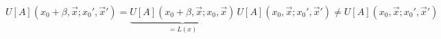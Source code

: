 \begin{equation}
  \label{eq:Unonper}
U[A](x_0+\beta,\vec x;x_0',\vec x') 
= \underbrace{U[A](x_0+\beta,\vec x;x_0,\vec x)}_{=L(x)} 
\, U[A](x_0,\vec x;x_0',\vec x') \neq U[A](x_0,\vec x;x_0',\vec x') 
\end{equation}

